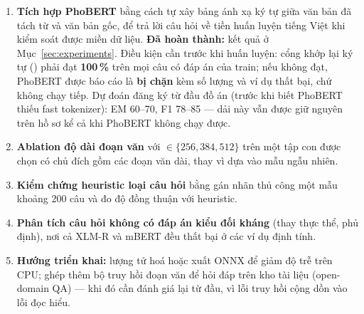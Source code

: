 \begin{enumerate}
        là có ý nghĩa. Lệnh:  (rồi  vào );
        ước tính 1 giờ 45 phút mỗi lần trên MPS.
        \fi
  \item \textbf{Tích hợp PhoBERT} bằng cách tự xây bảng ánh xạ ký tự giữa văn bản đã tách từ và văn bản
        gốc, để trả lời câu hỏi về tiền huấn luyện tiếng Việt khi kiểm soát được miền dữ liệu.
        \ifhasPho
        \textbf{Đã hoàn thành:} kết quả ở Mục~\ref{sec:experiments}.
        \else
        Điều kiện cần trước khi huấn luyện: cổng khớp lại ký tự ()
        phải đạt \textbf{100\,\%} trên mọi câu có đáp án của train; nếu không đạt, PhoBERT được báo
        cáo là \textbf{bị chặn} kèm số lượng và ví dụ thất bại, chứ không chạy tiếp. Dự đoán đăng ký
        từ đầu đồ án (trước khi biết PhoBERT thiếu fast tokenizer): EM 60--70, F1 78--85 --- dải này
        vẫn được giữ nguyên trên hồ sơ kể cả khi PhoBERT không chạy được.
        \fi
  \item \textbf{Ablation độ dài đoạn văn} với  $\in \{256, 384, 512\}$ trên một tập
        con được chọn có chủ đích gồm các đoạn văn dài, thay vì dựa vào mẫu ngẫu nhiên.
  \item \textbf{Kiểm chứng heuristic loại câu hỏi} bằng gán nhãn thủ công một mẫu khoảng 200 câu và
        đo độ đồng thuận với heuristic.
  \item \textbf{Phân tích câu hỏi không có đáp án kiểu đối kháng} (thay thực thể, phủ định), nơi cả
        XLM-R và mBERT đều thất bại ở các ví dụ định tính.
  \item \textbf{Hướng triển khai:} lượng tử hoá hoặc xuất ONNX để giảm độ trễ trên CPU; ghép thêm bộ
        truy hồi đoạn văn để hỏi đáp trên kho tài liệu (open-domain QA) --- khi đó cần đánh giá lại
        từ đầu, vì lỗi truy hồi cộng dồn vào lỗi đọc hiểu.
\end{enumerate}
